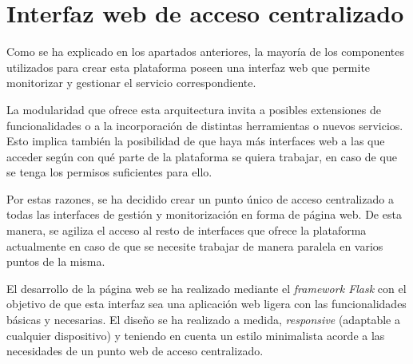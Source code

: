\section{Interfaz web de acceso centralizado}

Como se ha explicado en los apartados anteriores, la mayoría de los componentes utilizados para crear esta plataforma poseen una interfaz web que permite monitorizar y gestionar el servicio correspondiente.

La modularidad que ofrece esta arquitectura invita a posibles extensiones de funcionalidades o a la incorporación de distintas herramientas o nuevos servicios. Esto implica también la posibilidad de que haya más interfaces web a las que acceder según con qué parte de la plataforma se quiera trabajar, en caso de que se tenga los permisos suficientes para ello.

Por estas razones, se ha decidido crear un punto único de acceso centralizado a todas las interfaces de gestión y monitorización en forma de página web. De esta manera, se agiliza el acceso al resto de interfaces que ofrece la plataforma actualmente en caso de que se necesite trabajar de manera paralela en varios puntos de la misma.

El desarrollo de la página web se ha realizado mediante el \textit{framework Flask} con el objetivo de que esta interfaz sea una aplicación web ligera con las funcionalidades básicas y necesarias. El diseño se ha realizado a medida, \textit{responsive} (adaptable a cualquier dispositivo) y teniendo en cuenta un estilo minimalista acorde a las necesidades de un punto web de acceso centralizado.

